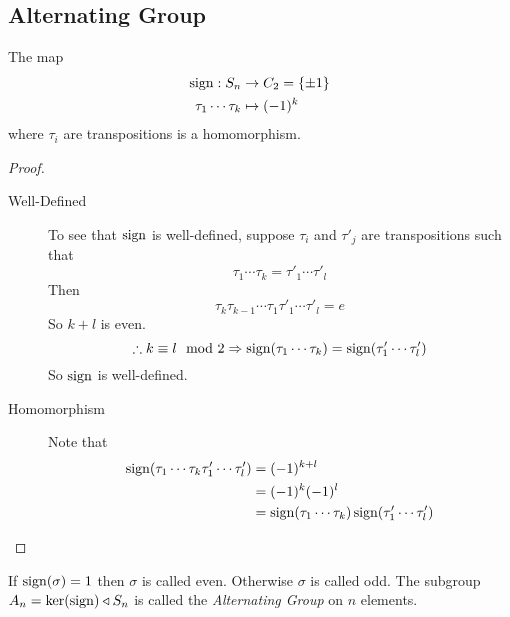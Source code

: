 \documentclass{article}
\begin{document}
\subsection{Alternating Group}
\begin{thm}
    The map
    \begin{align*}
        \operatorname{sign}: S_n &\rightarrow C_2 = \{\pm 1\} \\
        \tau_1 \cdots \tau_k &\mapsto (-1)^k
    \end{align*}
    where $\tau_i$ are transpositions is a homomorphism.
\end{thm}
\begin{proof}
    \begin{description}
        \item[Well-Defined] To see that $\operatorname{sign}$ is well-defined, suppose $\tau_i$ and $\tau'_j$ are transpositions such that
        \[
            \tau_1 \cdots \tau_k = \tau'_1 \cdots \tau'_l  
        \]
        Then
        \[
            \tau_k \tau_{k-1} \cdots \tau_1 \tau'_1 \cdots \tau'_l = e
        \]
        So $k + l$ is even. 
        \[
            \therefore k \equiv l \mod 2 \Rightarrow \operatorname{sign}(\tau_1 \cdots \tau_k) = \operatorname{sign}(\tau'_1 \cdots \tau'_l)  
        \]
        So $\operatorname{sign}$ is well-defined.

        \item[Homomorphism] Note that
        \begin{align*}
            \operatorname{sign}(\tau_1 \cdots \tau_k\tau'_1 \cdots \tau'_l) &= (-1)^{k + l} \\
            &= (-1)^k(-1)^l \\
            &=\operatorname{sign}(\tau_1 \cdots \tau_k)\operatorname{sign}(\tau'_1 \cdots \tau'_l)
        \end{align*}
    \end{description}
\end{proof}

\begin{defi}
    If $\operatorname{sign}(\sigma) = 1$ then $\sigma$ is called even. Otherwise $\sigma$ is called odd.
    The subgroup $A_n = \ker(\operatorname{sign}) \triangleleft S_n$ is called the \emph{Alternating Group} on $n$ elements.
\end{defi}
\end{document}
